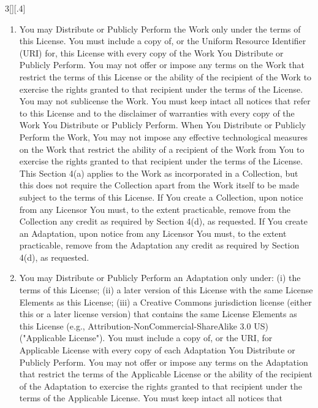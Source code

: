 \documentclass[8pt,a4paper]{article}
\begin{document}
\begin{multicols}{3}[][.4\paperwidth]
\begin{enumerate}
\begin{enumerate}
  \item You may Distribute or Publicly Perform the Work only under the terms
        of this License. You must include a copy of, or the Uniform Resource
        Identifier (URI) for, this License with every copy of the Work You
        Distribute or Publicly Perform. You may not offer or impose any terms
        on the Work that restrict the terms of this License or the ability of
        the recipient of the Work to exercise the rights granted to that
        recipient under the terms of the License. You may not sublicense the
        Work. You must keep intact all notices that refer to this License and
        to the disclaimer of warranties with every copy of the Work You
        Distribute or Publicly Perform. When You Distribute or Publicly
        Perform the Work, You may not impose any effective technological
        measures on the Work that restrict the ability of a recipient of the
        Work from You to exercise the rights granted to that recipient under
        the terms of the License. This Section 4(a) applies to the Work as
        incorporated in a Collection, but this does not require the Collection
        apart from the Work itself to be made subject to the terms of this
        License. If You create a Collection, upon notice from any Licensor You
        must, to the extent practicable, remove from the Collection any credit
        as required by Section 4(d), as requested. If You create an
        Adaptation, upon notice from any Licensor You must, to the extent
        practicable, remove from the Adaptation any credit as required by
        Section 4(d), as requested.
  \item You may Distribute or Publicly Perform an Adaptation only under: (i)
        the terms of this License; (ii) a later version of this License with
        the same License Elements as this License; (iii) a Creative Commons
        jurisdiction license (either this or a later license version) that
        contains the same License Elements as this License (e.g.,
        Attribution-NonCommercial-ShareAlike 3.0 US) ("Applicable License").
        You must include a copy of, or the URI, for Applicable License with
        every copy of each Adaptation You Distribute or Publicly Perform. You
        may not offer or impose any terms on the Adaptation that restrict the
        terms of the Applicable License or the ability of the recipient of the
        Adaptation to exercise the rights granted to that recipient under the
        terms of the Applicable License. You must keep intact all notices that

\end{enumerate}
\end{enumerate}
\end{multicols}
\end{document}
